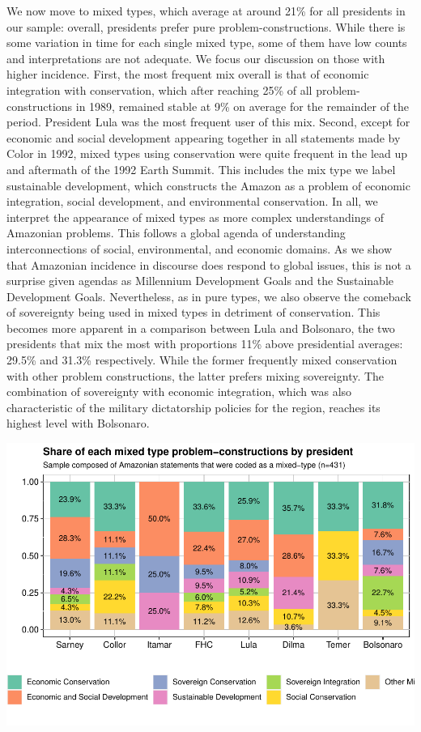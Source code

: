 \documentclass[]{interact}
\theoremstyle{plain}%
\theoremstyle{definition}
\theoremstyle{remark}
\begin{document}
We now move to mixed types, which average at around 21\% for all
presidents in our sample: overall, presidents prefer pure
problem-constructions. While there is some variation in time for each
single mixed type, some of them have low counts and interpretations are
not adequate. We focus our discussion on those with higher incidence.
First, the most frequent mix overall is that of economic integration
with conservation, which after reaching 25\% of all
problem-constructions in 1989, remained stable at 9\% on average for the
remainder of the period. President Lula was the most frequent user of
this mix. Second, except for economic and social development appearing
together in all statements made by Color in 1992, mixed types using
conservation were quite frequent in the lead up and aftermath of the
1992 Earth Summit. This includes the mix type we label sustainable
development, which constructs the Amazon as a problem of economic
integration, social development, and environmental conservation. In all,
we interpret the appearance of mixed types as more complex
understandings of Amazonian problems. This follows a global agenda of
understanding interconnections of social, environmental, and economic
domains. As we show that Amazonian incidence in discourse does respond
to global issues, this is not a surprise given agendas as Millennium
Development Goals and the Sustainable Development Goals. Nevertheless,
as in pure types, we also observe the comeback of sovereignty being used
in mixed types in detriment of conservation. This becomes more apparent
in a comparison between Lula and Bolsonaro, the two presidents that mix
the most with proportions 11\% above presidential averages: 29.5\% and
31.3\% respectively. While the former frequently mixed conservation with
other problem constructions, the latter prefers mixing sovereignty. The
combination of sovereignty with economic integration, which was also
characteristic of the military dictatorship policies for the region,
reaches its highest level with Bolsonaro.

\includegraphics[width=0.9\linewidth]{rticle_files/figure-latex/Figure 4: mixed-types by president-1}
\end{document}
